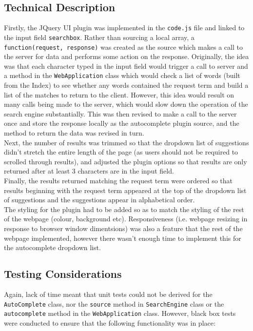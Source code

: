 \subsection{Technical Description}
Firstly, the JQuery UI plugin was implemented in the {\tt code.js} file and linked to the input field {\tt searchbox}.
Rather than sourcing a local array, a {\tt function(request, response)} was created as the source which makes a call to the server for data and performs some action on the response.
Originally, the idea was that each character typed in the input field would trigger a call to server and a method in the {\tt WebApplication} class which would check a list of words (built from the Index) to see whether any words contained the request term and build a list of the matches to return to the client.
However, this idea would result on many calls being made to the server, which would slow down the operation of the search engine substantially. This was then revised to make a call to the server once and store the response locally as the autocomplete plugin source, and the method to return the data was revised in turn.
\\
Next, the number of results was trimmed so that the dropdown list of suggestions didn't stretch the entire length of the page (as users should not be required to scrolled through results), and adjusted the plugin options so that results are only returned after at least 3 characters are in the input field.
\\
Finally, the results returned matching the request term were ordered so that results beginning with the request term appeared at the top of the dropdown list of suggestions and the suggestions appear in alphabetical order.
\\
The styling for the plugin had to be added so as to match the styling of the rest of the webpage (colour, background etc). Responsiveness (i.e. webpage resizing in response to browser window dimentsions) was also a feature that the rest of the webpage implemented, however there wasn't enough time to implement this for the autocomplete dropdown list.

\subsection{Testing Considerations}
Again, lack of time meant that unit tests could not be derived for the {\tt AutoComplete} class, nor the {\tt source} method in {\tt SearchEngine} class or the {\tt autocomplete} method in the {\tt WebApplication} class. However, black box tests were conducted to ensure that the following functionality was in place:

